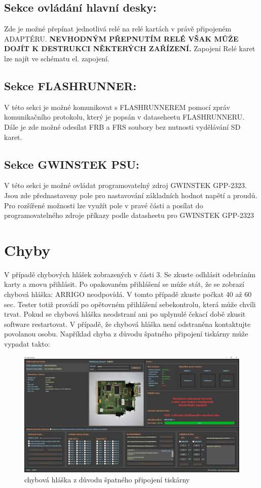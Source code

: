 \subsection{Sekce ovládání hlavní desky:}
Zde je možné přepínat jednotlivá relé na relé kartách v právě připojeném ADAPTÉRU.
\textbf{\color{red} NEVHODNÝM PŘEPNUTÍM RELÉ VŠAK MŮŽE DOJÍT K DESTRUKCI NĚKTERÝCH ZAŘÍZENÍ.}
Zapojení Relé karet lze najít ve schématu el. zapojení. 

\subsection{Sekce FLASHRUNNER:}
V této sekci je možné komunikovat s FLASHRUNNEREM pomocí zpráv komunikačního protokolu, který je popsán
v dataseheetu FLASHRUNNERU.
Dále je zde možné odesílat FRB a FRS soubory bez nutnosti vydělávání SD karet.

\subsection{Sekce GWINSTEK PSU:}
V této sekci je možné ovládat programovatelný zdroj GWINSTEK GPP-2323.
Jsou zde přednastaveny pole pro nastavování základních hodnot napětí a proudů.
Pro rozšířené možnosti lze využít pole v pravé části a posílat do programovatelného
zdroje příkazy podle datasheetu pro GWINSTEK GPP-2323

\section{Chyby}
V případě chybových hlášek zobrazených v části 3.
Se zkuste odhlásit odebráním karty a znovu přihlásit.
Po opakovaném přihlášení se může stát, že se zobrazí chybová hláška: ARRIGO neodpovídá.
V tomto případě zkuste počkat 40 až 60 sec. Tester totiž provádí po opětovném přihlášení sebekontrolu,
která může chvíli trvat. Pokud se chybová hláška neodstraní ani po uplynulé čekací době zkusit software restartovat.
V případě, že chybová hláška není odstraněna kontaktujte povolanou osobu. Například chyba z důvodu špatného připojení
tiskárny může vypadat takto:
\begin{figure}[ht!]
	\centering
	\includegraphics[width = 1\textwidth]{obrazky/HW_FAULT.PNG}
    \caption{chybová hláška z důvodu špatného připojení tiskárny}
\end{figure}



